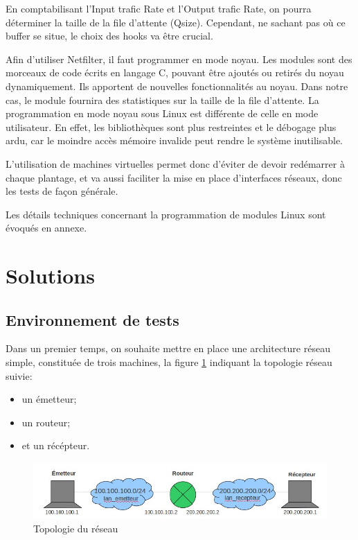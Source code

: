 \documentclass[a4paper]{article}
\begin{document}
En comptabilisant l'Input trafic Rate et l'Output trafic Rate,
on pourra déterminer la taille de la file d'attente (Qsize).
Cependant, ne sachant pas où ce buffer se situe, le choix des
hooks va être crucial.

Afin d'utiliser Netfilter, il faut programmer en mode noyau.
Les modules sont des morceaux de code écrits en langage C, pouvant
être ajoutés ou retirés du noyau dynamiquement. Ils apportent de
nouvelles fonctionnalités au noyau. Dans notre cas, le module
fournira des statistiques sur la taille de la file d'attente.
La programmation en mode noyau sous Linux est différente de celle
en mode utilisateur. En effet, les bibliothèques sont plus
restreintes et le débogage plus ardu, car le moindre accès
mémoire invalide peut rendre le système inutilisable.

L'utilisation de machines virtuelles permet donc d'éviter de
devoir redémarrer à chaque plantage, et va aussi faciliter
la mise en place d'interfaces réseaux, donc les tests de
façon générale.

Les détails techniques concernant la programmation de
modules Linux sont évoqués en annexe.

\section{Solutions}
\subsection{Environnement de tests}
Dans un premier temps, on souhaite mettre en place une
architecture réseau simple, constituée de trois machines, la
figure \ref{topo} indiquant la topologie réseau suivie:
\begin{itemize}
	\item un émetteur;
	\item un routeur;
	\item et un récépteur.
\end{itemize}

\begin{figure}[!ht]
	\centering
	\includegraphics[scale=.5]{topo.jpg}
	\caption{\label{topo} Topologie du réseau}
\end{figure}
\end{document}
